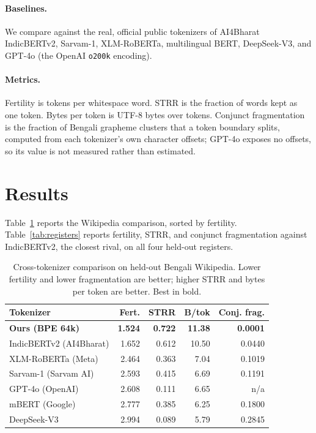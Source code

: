 \documentclass[11pt]{article}
\begin{document}
\paragraph{Baselines.} We compare against the real, official public tokenizers of
AI4Bharat IndicBERTv2, Sarvam-1, XLM-RoBERTa, multilingual BERT, DeepSeek-V3, and
GPT-4o (the OpenAI \texttt{o200k} encoding).

\paragraph{Metrics.} Fertility is tokens per whitespace word. STRR is the
fraction of words kept as one token. Bytes per token is UTF-8 bytes over tokens.
Conjunct fragmentation is the fraction of Bengali grapheme clusters that a token
boundary splits, computed from each tokenizer's own character offsets; GPT-4o
exposes no offsets, so its value is not measured rather than estimated.

\section{Results}
Table~\ref{tab:main} reports the Wikipedia comparison, sorted by fertility.
Table~\ref{tab:registers} reports fertility, STRR, and conjunct fragmentation
against IndicBERTv2, the closest rival, on all four held-out registers.

\begin{table}[t]
\centering
\small
\begin{tabular}{lrrrr}
\toprule
Tokenizer & Fert. & STRR & B/tok & Conj. frag. \\
\midrule
\textbf{Ours (BPE 64k)} & \textbf{1.524} & \textbf{0.722} & \textbf{11.38} & \textbf{0.0001} \\
IndicBERTv2 (AI4Bharat) & 1.652 & 0.612 & 10.50 & 0.0440 \\
XLM-RoBERTa (Meta) & 2.464 & 0.363 & 7.04 & 0.1019 \\
Sarvam-1 (Sarvam AI) & 2.593 & 0.415 & 6.69 & 0.1191 \\
GPT-4o (OpenAI) & 2.608 & 0.111 & 6.65 & n/a \\
mBERT (Google) & 2.777 & 0.385 & 6.25 & 0.1800 \\
DeepSeek-V3 & 2.994 & 0.089 & 5.79 & 0.2845 \\
\bottomrule
\end{tabular}
\caption{Cross-tokenizer comparison on held-out Bengali Wikipedia. Lower
fertility and lower fragmentation are better; higher STRR and bytes per token
are better. Best in bold.}
\label{tab:main}
\end{table}
\end{document}
